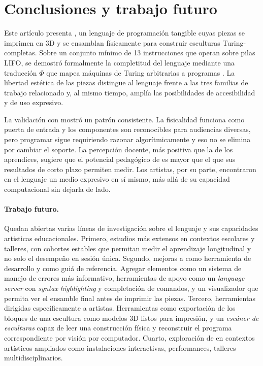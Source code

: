 
\section{Conclusiones y trabajo futuro}
\label{sec:conclusion}

Este art\'iculo presenta \sculpt, un lenguaje de programaci\'on
tangible cuyas piezas se imprimen en 3D y se ensamblan f\'isicamente
para construir esculturas Turing-completas. Sobre un conjunto m\'inimo
de 13 instrucciones que operan sobre pilas LIFO, se demostr\'o
formalmente la completitud del lenguaje mediante una traducci\'on
$\Phi$ que mapea m\'aquinas de Turing arbitrarias a programas \sculpt.
La libertad est\'etica de las piezas distingue al lenguaje frente a las tres
familias de trabajo relacionado y, al mismo tiempo, ampl\'ia las
posibilidades de accesibilidad y de uso expresivo.

La validaci\'on con mostr\'o un patr\'on consistente.
La fisicalidad funciona como puerta de entrada y los componentes son
reconocibles para audiencias diversas, pero programar sigue requiriendo
razonar algor\'itmicamente y eso no se elimina por cambiar el soporte.
La percepci\'on docente, m\'as positiva que la de los aprendices,
sugiere que el potencial pedag\'ogico de \sculpt es mayor que el que
sus resultados de corto plazo permiten medir. Los artistas, por su
parte, encontraron en el lenguaje un medio expresivo en s\'i mismo,
m\'as all\'a de su capacidad computacional sin dejarla de lado.

\paragraph{Trabajo futuro.}
Quedan abiertas varias l\'ineas de investigaci\'on sobre el lenguaje y sus capacidades artisticas educacionales.
Primero, estudios m\'as extensos en
contextos escolares y talleres, con cohortes estables que permitan
medir el aprendizaje longitudinal y no solo el desempe\~no en sesi\'on
\'unica. Segundo, mejoras a \sculpter como herramienta de desarrollo y como gui\'a de referencia.
Agregar elementos como un sistema de manejo de errores m\'as informativo, herramientas de apoyo como un \emph{language server} con
\emph{syntax highlighting} y completaci\'on de comandos, y un visualizador que
permita ver el ensamble final antes de imprimir las piezas. Tercero,
herramientas dirigidas espec\'ificamente a artistas. Herramientas como exportaci\'on de
los bloques de una escultura como modelos 3D listos para impresi\'on,
y un \emph{esc\'aner de esculturas} capaz de leer una construcci\'on
f\'isica y reconstruir el programa correspondiente por visi\'on por
computador. Cuarto, exploraci\'on de \sculpt en contextos art\'isticos
ampliados como instalaciones interactivas, performances, talleres
multidisciplinarios.


